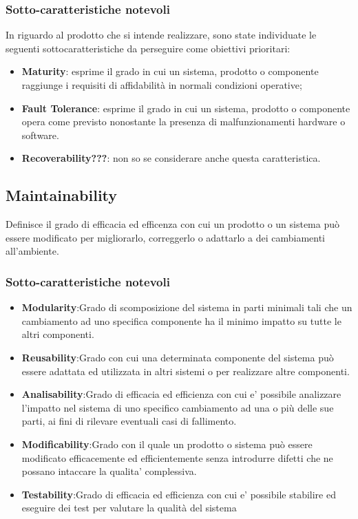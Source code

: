\subsubsection{Sotto-caratteristiche notevoli}
In riguardo al prodotto che si intende realizzare, sono state individuate le seguenti sottocaratteristiche da perseguire come obiettivi prioritari: 
\begin{itemize}
	\item{\textbf{Maturity}}: esprime il grado in cui un sistema, prodotto o componente raggiunge i requisiti di affidabilità in normali condizioni operative;
	\item{\textbf{Fault Tolerance}}: esprime il grado in cui un sistema, prodotto o componente opera come previsto nonostante la presenza di malfunzionamenti hardware o software.
	\item{\textbf{Recoverability???}}: non so se considerare anche questa caratteristica.
\end{itemize}

\subsection{Maintainability}
Definisce il grado di efficacia ed efficenza con cui un prodotto o un sistema può essere modificato per migliorarlo, correggerlo o adattarlo a dei cambiamenti all'ambiente. 
\subsubsection{Sotto-caratteristiche notevoli}
\begin{itemize}
	\item{\textbf{Modularity}}:Grado di scomposizione del sistema in parti minimali tali che un cambiamento ad uno specifica componente ha il minimo impatto su tutte le altri componenti.
	\item{\textbf{Reusability}}:Grado con cui una determinata componente del sistema può essere adattata ed utilizzata in altri sistemi o per realizzare altre componenti.
	\item{\textbf{Analisability}}:Grado di efficacia ed efficienza con cui e' possibile analizzare l'impatto nel sistema di uno specifico cambiamento ad una o più delle sue parti, ai fini di rilevare eventuali casi di fallimento.
	\item{\textbf{Modificability}}:Grado con il quale un prodotto o sistema può essere modificato efficacemente ed efficientemente senza introdurre difetti che ne possano intaccare la qualita' complessiva.
	\item{\textbf{Testability}}:Grado di efficacia ed efficienza con cui e' possibile stabilire ed eseguire dei test per valutare la qualità del sistema
\end{itemize}
